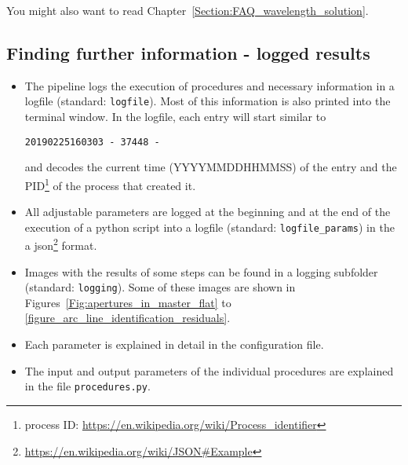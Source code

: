 \documentclass[10pt,a4paper]{article}
\begin{document}
%
You might also want to read Chapter~\ref{Section:FAQ_wavelength_solution}.



\subsection{Finding further information - logged results}

\begin{itemize}
  \item The pipeline logs the execution of procedures and necessary information in a logfile (standard: \verb|logfile|). Most of this information is also printed into the terminal window. In the logfile, each entry will start similar to 
  \begin{lstlisting}[style=base]
20190225160303 - 37448 - 
  \end{lstlisting}
  and decodes the current time (YYYYMMDDHHMMSS) of the entry and the PID\footnote{process ID: \url{https://en.wikipedia.org/wiki/Process_identifier}} of the process that created it.
  \item All adjustable parameters are logged at the beginning and at the end of the execution of a python script into a logfile (standard: \verb|logfile_params|) in the a json\footnote{\url{https://en.wikipedia.org/wiki/JSON\#Example}} format.
  \item Images with the results of some steps can be found in a logging subfolder (standard: \verb|logging|). Some of these images are shown in Figures~\ref{Fig:apertures_in_master_flat} to \ref{figure_arc_line_identification_residuals}.
  \item Each parameter is explained in detail in the configuration file.
  \item The input and output parameters of the individual procedures are explained in the file \verb|procedures.py|.
\end{itemize}
\end{document}

